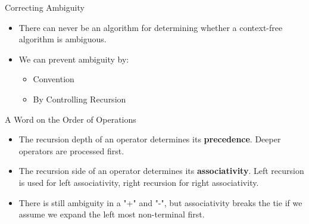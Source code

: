 \documentclass[handout]{beamer}
\newenvironment{code}{%
 \VerbatimEnvironment
 \begin{adjustbox}{max width=\textwidth, max height=0.7\textheight}
 \begin{BVerbatim}
  }{
  \end{BVerbatim}
 \end{adjustbox}
}
\begin{document}
\begin{frame}{Correcting Ambiguity}
\begin{itemize}
    \item There can never be an algorithm for determining whether a context-free algorithm is ambiguous.
    \item We can prevent ambiguity by:
    \begin{itemize}
        \item Convention 
        \item By Controlling Recursion
    \end{itemize}
\end{itemize}
\end{frame}




\begin{frame}{A Word on the Order of Operations}
    \begin{itemize}
        \item The recursion depth of an operator determines its {\bf precedence}. Deeper operators are processed first.
        \item The recursion side of an operator determines its {\bf associativity}. Left recursion is used for left associativity, right recursion for right associativity.
        \item There is still ambiguity in a "+" and "-", but associativity breaks the tie if we assume we expand the left most non-terminal first.
    \end{itemize}
\end{frame}
\end{document}
